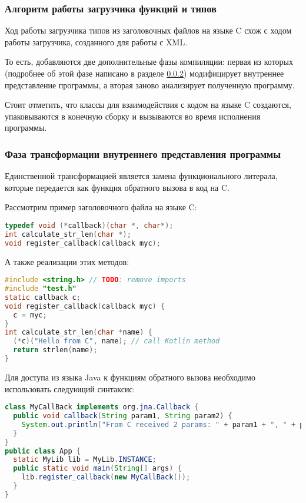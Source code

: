 \subsubsection{Алгоритм работы загрузчика функций и типов}

Ход работы загрузчика типов из заголовочных файлов на языке C схож с ходом работы загрузчика, созданного для работы с XML.

То есть, добавляются две дополнительные фазы компиляции: первая из которых (подробнее об этой фазе написано в разделе \ref{c-tranformation-phase}) модифицирует внутреннее представление программы, а вторая заново анализирует полученную программу.

Стоит отметить, что классы для взаимодействия с кодом на языке C создаются, упаковываются в конечную сборку и вызываются во время исполнения программы.

\subsubsection{Фаза трансформации внутреннего представления программы}\label{c-tranformation-phase}
Единственной трансформацией является замена функционального литерала, которые передается как функция обратного вызова в код на C.

Рассмотрим пример заголовочного файла на языке C:

\begin{lstlisting}[language=C]
typedef void (*callback)(char *, char*);
int calculate_str_len(char *);
void register_callback(callback myc);
\end{lstlisting}

А также реализации этих методов:
\begin{lstlisting}[language=C]
#include <string.h> // TODO: remove imports
#include "test.h"
static callback c;
void register_callback(callback myc) {
  c = myc;
}
int calculate_str_len(char *name) {
  (*c)("Hello from C", name); // call Kotlin method
  return strlen(name);
}
\end{lstlisting}

Для доступа из языка Java к функциям обратного вызова необходимо использовать следующий синтаксис:
\begin{lstlisting}[language=Java]
class MyCallBack implements org.jna.Callback {
  public void callback(String param1, String param2) {
    System.out.println("From C received 2 params: " + param1 + ", " + param2);
  }
}
public class App {
  static MyLib lib = MyLib.INSTANCE;
  public static void main(String[] args) {
    lib.register_callback(new MyCallBack());
  }
}
\end{lstlisting}

